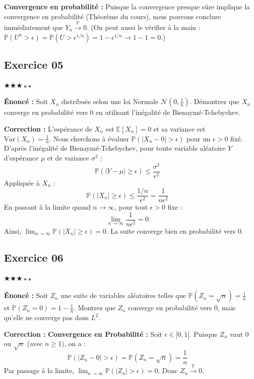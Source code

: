 \documentclass[11pt,a4paper]{article}
\begin{document}
\textbf{Convergence en probabilité :}
Puisque la convergence presque sûre implique la convergence en probabilité (Théorème du cours), nous pouvons conclure immédiatement que $Y_n \xrightarrow{\mathbb{P}} 0$.
(On peut aussi le vérifier à la main : $\mathbb{P}(U^n > \epsilon) = \mathbb{P}(U > \epsilon^{1/n}) = 1 - \epsilon^{1/n} \to 1 - 1 = 0$.)


\subsection*{Exercice 05}

\quad $\bigstar\bigstar\bigstar\star\star$

\textbf{Énoncé :}
Soit $X_n$ distribuée selon une loi Normale $\mathcal{N}\left(0, \frac{1}{n}\right)$.
Démontrez que $X_n$ converge en probabilité vers $0$ en utilisant l'inégalité de Bienaymé-Tchebychev.

\textbf{Correction :}
L'espérance de $X_n$ est $\mathbb{E}[X_n] = 0$ et sa variance est $\text{Var}(X_n) = \frac{1}{n}$.
Nous cherchons à évaluer $\mathbb{P}(|X_n - 0| > \epsilon)$ pour un $\epsilon > 0$ fixé.
D'après l'inégalité de Bienaymé-Tchebychev, pour toute variable aléatoire $Y$ d'espérance $\mu$ et de variance $\sigma^2$ :
$$ \mathbb{P}(|Y - \mu| \ge \epsilon) \le \frac{\sigma^2}{\epsilon^2} $$
Appliquée à $X_n$ :
$$ \mathbb{P}(|X_n| \ge \epsilon) \le \frac{1/n}{\epsilon^2} = \frac{1}{n\epsilon^2} $$
En passant à la limite quand $n \to \infty$, pour tout $\epsilon > 0$ fixe :
$$ \lim_{n \to \infty} \frac{1}{n\epsilon^2} = 0 $$
Ainsi, $\lim_{n \to \infty} \mathbb{P}(|X_n| \ge \epsilon) = 0$.
La suite converge bien en probabilité vers $0$.


\subsection*{Exercice 06}

\quad $\bigstar\bigstar\bigstar\star\star$

\textbf{Énoncé :}
Soit $Z_n$ une suite de variables aléatoires telles que $\mathbb{P}(Z_n = \sqrt{n}) = \frac{1}{n}$ et $\mathbb{P}(Z_n = 0) = 1 - \frac{1}{n}$.
Montrez que $Z_n$ converge en probabilité vers $0$, mais qu'elle ne converge pas dans $L^2$.

\textbf{Correction :}
\textbf{Convergence en Probabilité :}
Soit $\epsilon \in ]0, 1[$. Puisque $Z_n$ vaut $0$ ou $\sqrt{n}$ (avec $n \ge 1$), on a :
$$ \mathbb{P}(|Z_n - 0| > \epsilon) = \mathbb{P}(Z_n = \sqrt{n}) = \frac{1}{n} $$
Par passage à la limite, $\lim_{n \to \infty} \mathbb{P}(|Z_n| > \epsilon) = 0$. Donc $Z_n \xrightarrow{\mathbb{P}} 0$.
\end{document}
